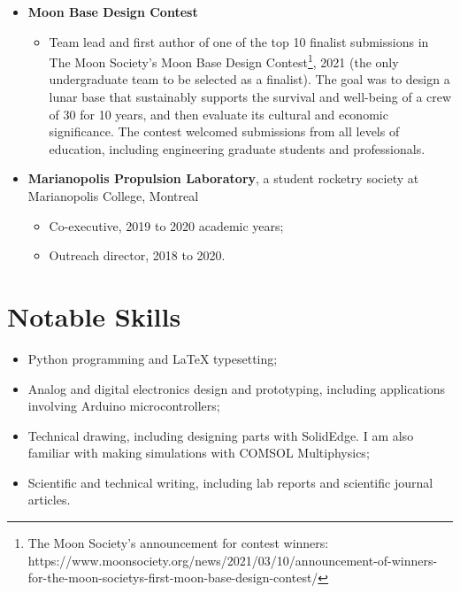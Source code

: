 \documentclass{article}
\newcommand{\cvsection}[1]{\section*{\rmfamily#1}}
\begin{document}
\begin{itemize}
\begin{itemize}
        \item Mission Science subsystem (disbanded due to mission progress)
        \begin{itemize}
            \item General member, September 2021 to August 2022. Our task was scoping for alternative missions for the team's CubeSat project FINCH, which was published in the team's submission to the Small Satellite Conference 2022\footnote[3]{Miles, A. (n.d.). FINCH: A blueprint for accessible and scientifically valuable remote sensing satellite missions. DigitalCommons@USU. \newline https://digitalcommons.usu.edu/smallsat/2022/all2022/88/}.
        \end{itemize} 
    \end{itemize}
    \item \textbf{Moon Base Design Contest}
    \begin{itemize}
        \item Team lead and first author of one of the top 10 finalist submissions in The Moon Society's Moon Base Design Contest\footnote[4]{The Moon Society's announcement for contest winners: https://www.moonsociety.org/news/2021/03/10/announcement-of-winners-for-the-moon-societys-first-moon-base-design-contest/}, 2021 (the only undergraduate team to be selected as a finalist). The goal was to design a lunar base that sustainably supports the survival and well-being of a crew of 30 for 10 years, and then evaluate its cultural and economic significance. The contest welcomed submissions from all levels of education, including engineering graduate students and professionals.
    \end{itemize}
    \item \textbf{Marianopolis Propulsion Laboratory}, a student rocketry society at Marianopolis College, Montreal
    \begin{itemize}
        \item Co-executive, 2019 to 2020 academic years;
        \item Outreach director, 2018 to 2020.
    \end{itemize}
\end{itemize}

\cvsection{Notable Skills}

\begin{itemize}
    \item Python programming and LaTeX typesetting;
    
    \item Analog and digital electronics design and prototyping, including applications involving Arduino microcontrollers;
    
    \item Technical drawing, including designing parts with SolidEdge. I am also familiar with making simulations with COMSOL Multiphysics;
    
    \item Scientific and technical writing, including lab reports and scientific journal articles.
    
\end{itemize}
\end{document}
